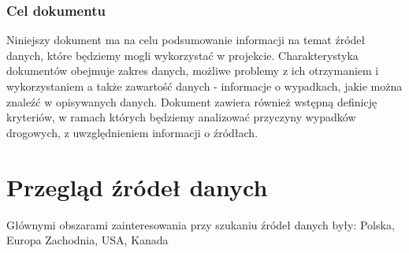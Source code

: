 \subsubsection{Cel dokumentu}\label{cel-dokumentu}

Niniejszy dokument ma na celu podsumowanie informacji na temat źródeł
danych, które będziemy mogli wykorzystać w projekcie. Charakterystyka
dokumentów obejmuje zakres danych, możliwe problemy z ich otrzymaniem i
wykorzystaniem a także zawartość danych - informacje o wypadkach, jakie
można znaleźć w opisywanych danych. Dokument zawiera również wstępną
definicję kryteriów, w ramach których będziemy analizować przyczyny
wypadków drogowych, z uwzględnieniem informacji o źródłach.

\section{Przegląd źródeł danych}\label{przeglad-zrode-danych}

Głównymi obszarami zainteresowania przy szukaniu źródeł danych były:
Polska, Europa Zachodnia, USA, Kanada

